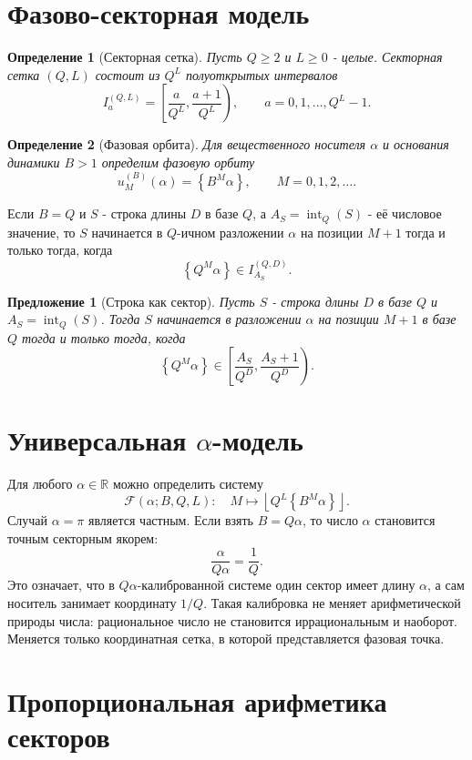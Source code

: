 \documentclass[11pt,a4paper]{article}
\newtheorem{definition}{Определение}
\newtheorem{proposition}{Предложение}
\newcommand{\fracpart}[1]{\left\{#1\right\}}
\newcommand{\floor}[1]{\left\lfloor #1 \right\rfloor}
\newcommand{\R}{\mathbb{R}}
\begin{document}
\section{Фазово-секторная модель}

\begin{definition}[Секторная сетка]
Пусть $Q\ge2$ и $L\ge0$ - целые.  Секторная сетка $(Q,L)$ состоит из $Q^L$ полуоткрытых интервалов
\[
  I_a^{(Q,L)}=\left[\frac{a}{Q^L},\frac{a+1}{Q^L}\right),
  \qquad a=0,1,\dots,Q^L-1.
\]
\end{definition}

\begin{definition}[Фазовая орбита]
Для вещественного носителя $\alpha$ и основания динамики $B>1$ определим фазовую орбиту
\[
  u_M^{(B)}(\alpha)=\fracpart{B^M\alpha},\qquad M=0,1,2,\dots.
\]
\end{definition}

Если $B=Q$ и $S$ - строка длины $D$ в базе $Q$, а $A_S=\operatorname{int}_Q(S)$ - её числовое значение, то $S$ начинается в $Q$-ичном разложении $\alpha$ на позиции $M+1$ тогда и только тогда, когда
\[
  \fracpart{Q^M\alpha}\in I_{A_S}^{(Q,D)}.
\]

\begin{proposition}[Строка как сектор]
Пусть $S$ - строка длины $D$ в базе $Q$ и $A_S=\operatorname{int}_Q(S)$.  Тогда $S$ начинается в разложении $\alpha$ на позиции $M+1$ в базе $Q$ тогда и только тогда, когда
\[
  \fracpart{Q^M\alpha}\in \left[\frac{A_S}{Q^D},\frac{A_S+1}{Q^D}\right).
\]
\end{proposition}

\section{Универсальная $\alpha$-модель}

Для любого $\alpha\in\R$ можно определить систему
\[
  \mathcal{F}(\alpha;B,Q,L):\quad M\mapsto \floor{Q^L\fracpart{B^M\alpha}}.
\]
Случай $\alpha=\pi$ является частным.  Если взять $B=Q\alpha$, то число $\alpha$ становится точным секторным якорем:
\[
  \frac{\alpha}{Q\alpha}=\frac1Q.
\]
Это означает, что в $Q\alpha$-калиброванной системе один сектор имеет длину $\alpha$, а сам носитель занимает координату $1/Q$.  Такая калибровка не меняет арифметической природы числа: рациональное число не становится иррациональным и наоборот.  Меняется только координатная сетка, в которой представляется фазовая точка.

\section{Пропорциональная арифметика секторов}
\end{document}
